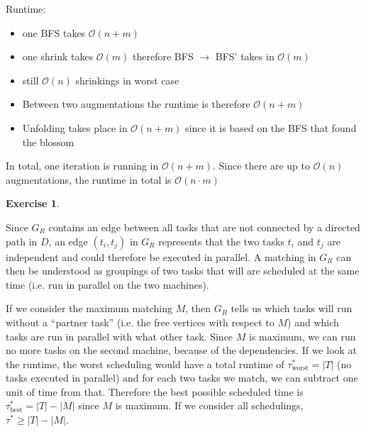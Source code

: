 \documentclass[a4paper,12pt,headsepline]{scrartcl}
\newtheorem{aufgabe}{Exercise}
\begin{document}
\begin{enumerate}[a)]
\begin{algorithm}[H]
\end{algorithm}

    Runtime:
    \begin{itemize}
        \item one BFS takes $\mathcal{O}(n+m)$
        \item one shrink takes $\mathcal{O}(m)$ therefore BFS $\to$ BFS' takes in $\mathcal{O}(m)$ 
        \item still $\mathcal{O}(n)$ shrinkings in worst case
        \item Between two augmentations the runtime is therefore $\mathcal{O}(n+m)$
        \item Unfolding takes place in $\mathcal{O}(n+m)$ since it is based on the BFS that found the blossom
    \end{itemize}
    In total, one iteration is running in $\mathcal{O}(n+m)$. Since there are up to $\mathcal{O}(n)$ augmentations, the runtime in total is $\mathcal{O}(n\cdot m)$
  
\end{enumerate}

\newpage
\begin{aufgabe}
\end{aufgabe}

Since $G_R$ contains an edge between all tasks that are not connected by a directed path in $D$, an edge $(t_i,t_j)$ in $G_R$ represents that the two tasks $t_i$ and $t_j$ are independent and could therefore be executed in parallel.
A matching in $G_R$ can then be understood as groupings of two tasks that will are scheduled at the same time (i.e. run in parallel on the two machines).

If we consider the maximum matching $M$, then $G_R$ tells us which tasks will run without a ``partner task'' (i.e. the free vertices with respect to $M$) and which tasks are run in parallel with what other task.
Since $M$ is maximum, we can run no more tasks on the second machine, because of the dependencies.
If we look at the runtime, the worst scheduling would have a total runtime of $\tau_\text{worst}^*=|T|$ (no tasks executed in parallel) and for each two tasks we match, we can subtract one unit of time from that.
Therefore the best possible scheduled time is $\tau_\text{best}^*=|T|-|M|$ since $M$ is maximum.
If we consider all schedulings, $\tau^*\ge|T|-|M|$.
\end{document}
